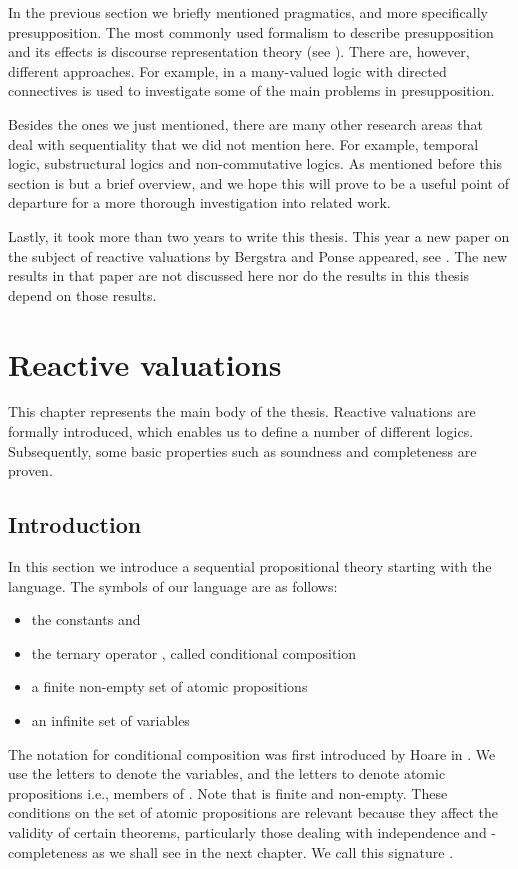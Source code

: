 \documentclass[a4paper,twoside,openright]{report}
\begin{document}
In the previous section we briefly mentioned pragmatics, and more specifically presupposition. The most commonly used formalism to describe presupposition and its effects is discourse representation theory (see \cite{DHT}). There are, however, different approaches. For example, in \cite{kracht} a many-valued logic with directed connectives is used to investigate some of the main problems in presupposition.

Besides the ones we just mentioned, there are many other research areas that deal with sequentiality that we did not mention here. For example, temporal logic, substructural logics and non-commutative logics. As mentioned before this section is but a brief overview, and we hope this will prove to be a useful point of departure for a more thorough investigation into related work.

Lastly, it took more than two years to write this thesis. This year a new paper on the subject of reactive valuations by Bergstra and Ponse appeared, see \cite{future}. The new results in that paper are not discussed here nor do the results in this thesis depend on those results.



\chapter{Reactive valuations}

This chapter represents the main body of the thesis. Reactive valuations are formally introduced, which enables us to define a number of different logics. Subsequently, some basic properties such as soundness and completeness are proven. 

\section{Introduction}
In this section we introduce a sequential propositional theory starting with the language. The symbols of our language are as follows:
\begin{itemize}
\item the constants  and 
\item the ternary operator , called conditional composition
\item a finite non-empty set  of atomic propositions
\item an infinite set of variables 
\end{itemize}
The notation  for conditional composition was first introduced by Hoare in \cite{hoare}. We use the letters  to denote the variables, and the letters  to denote atomic propositions i.e., members of .  Note that  is finite and non-empty. These conditions on the set of atomic propositions are relevant because they affect the validity of certain theorems, particularly those dealing with independence and -completeness as we shall see in the next chapter. We call this signature .
\end{document}
